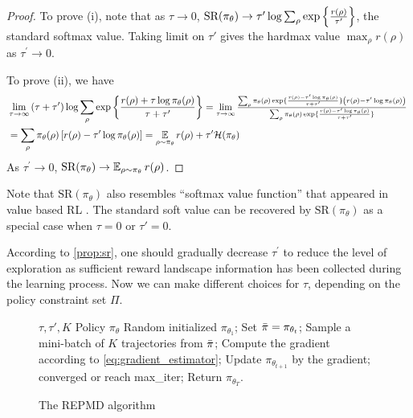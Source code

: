 \documentclass{article} %
\begin{document}
\begin{proof}
To prove (i), note that as $\tau \to 0$, $\text{SR}(\pi_\theta) \to \tau^{\prime} \log{ \sum_{\rho}{ \exp\left\{ \frac{r(\rho) }{ \tau^{\prime} } \right\} }}$, the standard softmax value. Taking limit on $\tau'$ gives the hardmax value $\max_{\rho}{r(\rho)}$ as $\tau^{\prime} \to 0$.
	
To prove (ii), we have 
\begin{align*}
	&\lim\limits_{\tau \to \infty}{ (\tau + \tau^{\prime})\log{ \sum_{\rho}{ \exp\left\{ \frac{r(\rho) + \tau \log{\pi_\theta(\rho)} }{\tau + \tau^{\prime}} \right\} }} } = {\scalebox{.95} {$\lim\limits_{\tau \to \infty}{ \frac{ \sum_{\rho}{ \pi_\theta(\rho) \exp\{ \frac{r(\rho) - \tau^{\prime} \log{\pi_\theta(\rho)} }{\tau + \tau^{\prime}} \} \left( r(\rho) - \tau^{\prime}\log{\pi_\theta(\rho)} \right) } }{  \sum_{\rho}{ \pi_\theta(\rho) \exp\{ \frac{r(\rho) - \tau^{\prime} \log{\pi_\theta(\rho)} }{\tau + \tau^{\prime}} \} } } }$ } }\\
	&= \sum_{\rho}{ \pi_\theta(\rho) \left[ r(\rho) - \tau^{\prime}\log{\pi_\theta(\rho)} \right] } = \ep_{\rho \sim \pi_\theta}{r(\rho)} + \tau^{\prime} \mathcal{H}(\pi_\theta)
\end{align*}
As $\tau^{\prime} \to 0$, $\text{SR}(\pi_\theta) \to \operatorname*{\mathbb{E}}_{\rho \sim \pi_\theta}{r(\rho)}$.
\end{proof}

Note that $\text{SR}(\pi_\theta)$ also resembles ``softmax value function'' that appeared in value based RL \citep{nachum2017bridging,haarnoja2018soft,ding2017cold}. The standard soft value can be recovered by $\text{SR}(\pi_\theta)$ as a special case when $\tau = 0$ or $\tau'=0$. 

According to \cref{prop:sr}, one should gradually decrease $\tau^{\prime}$ to reduce the level of exploration as sufficient reward landscape information has been collected during the learning process. Now we can make different choices for $\tau$, depending on the policy constraint set $\Pi$.

\begin{figure}
\begin{minipage}{0.56\textwidth}
\begin{algorithm}[H]
\caption{\label{alg:repmd}  The REPMD algorithm}
\begin{algorithmic}[1]
  \INPUT $\tau, \tau', K$
  \OUTPUT  Policy $\pi_\theta$
  \STATE Random initialized $\pi_{\theta_1}$;
  \STATE Set $\bar{\pi} = \pi_{\theta_t}$;
  \REPEAT 
  \STATE Sample a mini-batch of $K$ trajectories from $\bar{\pi}$;
  \STATE Compute the gradient according to \cref{eq:gradient_estimator};
  \STATE Update $\pi_{\theta_{t+1}}$ by the gradient;
  \UNTIL converged or reach max\_iter;
  \ENDFOR
  \STATE Return $\pi_{\theta_T}$.
\end{algorithmic}
\end{algorithm}
\end{minipage}
\end{figure}
\end{document}
